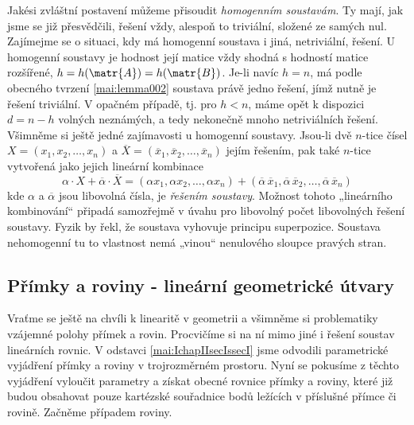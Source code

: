       Jakési zvláštní postavení můžeme přisoudit \emph{homogenním soustavám}. Ty mají, jak jsme se
      již přesvědčili, řešení vždy, alespoň to triviální, složené ze samých nul. Zajímejme se o
      situaci, kdy má homogenní soustava i jiná, netriviální, řešení. U homogenní soustavy je
      hodnost její matice vždy shodná s hodností matice rozšířené, \(h = h(\matr{A}) =
      h(\matr{B})\). Je-li navíc \(h = n\), má podle obecného tvrzení \ref{mai:lemma002} soustava
      právě jedno řešení, jímž nutně je řešení triviální. V opačném případě, tj. pro \(h < n\), máme
      opět k dispozici \(d = n - h\) volných neznámých, a tedy nekonečně mnoho netriviálních řešení.
      Všimněme si ještě jedné zajímavosti u homogenní soustavy. Jsou-li dvě \(n\)-tice čísel \(X =
      (x_1, x_2, \ldots, x_n)\) a \(\overline{X} = (\overline{x}_1, \overline{x}_2, \ldots,
      \overline{x}_n)\) jejím řešením, pak také \(n\)-tice vytvořená jako jejich lineární kombinace
      \begin{equation*}
        \alpha\cdot X + \overline{\alpha}\cdot\overline{X} = 
          (\alpha x_1, \alpha x_2, \ldots, \alpha x_n) + 
          (\overline{\alpha}\,\overline{x}_1, 
          \overline{\alpha}\,\overline{x}_2, \ldots, 
          \overline{\alpha}\,\overline{x}_n)
      \end{equation*}
      kde \(\alpha\) a \(\overline{\alpha}\) jsou libovolná čísla, je \emph{řešením soustavy}.
      Možnost tohoto „lineárního kombinování“ připadá samozřejmě v úvahu pro libovolný počet
      libovolných řešení soustavy. Fyzik by řekl, že soustava vyhovuje principu superpozice.
      Soustava nehomogenní tu to vlastnost nemá „vinou“ nenulového sloupce pravých stran.
    
    \subsection{Přímky a roviny - lineární geometrické útvary}
      Vraťme se ještě na chvíli k linearitě v geometrii a všimněme si problematiky vzájemné polohy
      přímek a rovin. Procvičíme si na ní mimo jiné i řešení soustav lineárních rovnic. V odstavci
      \ref{mai:IchapIIsecIssecI} jsme odvodili parametrické vyjádření přímky a roviny v
      trojrozměrném prostoru. Nyní se pokusíme z těchto vyjádření vyloučit parametry a získat obecné
      rovnice přímky a roviny, které již budou obsahovat pouze kartézské souřadnice bodů ležících v
      příslušné přímce či rovině. Začněme případem roviny.

      

